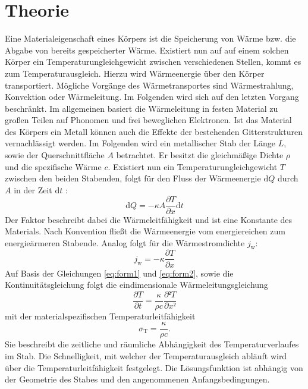 
\section{Theorie}
\label{sec:Theorie}
Eine Materialeigenschaft eines Körpers ist die Speicherung von Wärme bzw. die Abgabe
 von bereits gespeicherter Wärme. Existiert nun auf auf einem solchen Körper
 ein Temperaturungleichgewicht zwischen verschiedenen Stellen, kommt es zum Temperaturausgleich.
 Hierzu wird Wärmeenergie über den Körper transportiert.
Mögliche Vorgänge des Wärmetransportes sind Wärmestrahlung, Konvektion oder
  Wärmeleitung. Im Folgenden wird sich auf den letzten Vorgang beschränkt. Im
  allgemeinen basiert die Wärmeleitung in festen Material zu großen Teilen auf Phonomen und
   frei beweglichen Elektronen. Ist das Material des Körpers ein Metall können auch die Effekte der
    bestehenden Gitterstrukturen vernachlässigt werden. Im Folgenden wird ein metallischer Stab der
    Länge $L$, sowie der Querschnittfläche $A$ betrachtet. Er besitzt die
    gleichmäßige Dichte $\rho$ und die spezifische Wärme $c$. Existiert nun ein
    Temperaturungleichgewicht $T$ zwischen den beiden Stabenden, folgt für den Fluss
     der Wärmeenergie $\text{d}Q$ durch $A$ in der Zeit $\text{d}t$ :
     \begin{equation}
       \text{d}Q = -\kappa A \frac{\partial T}{\partial x} \text{d}t \label{eq:form1}
       \end{equation}
       Der Faktor \kappa beschreibt dabei die Wärmeleitfähigkeit und ist eine
        Konstante des Materials. Nach Konvention fließt die Wärmeenergie vom
         energiereichen zum energieärmeren Stabende. Analog folgt für die Wärmestromdichte $j_\text{w}$:
         \begin{equation}
           j_\text{w} = -\kappa \frac{\partial T}{\partial x} \label{eq:form2}
           \end{equation}
           Auf Basis der Gleichungen \ref{eq:form1} und \ref{eq:form2}, sowie die Kontinuitätsgleichung folgt
            die eindimensionale Wärmeleitungsgleichung
            \begin{equation}
              \frac{\partial T}{\partial t} = \frac{\kappa}{\rho c}\frac{\partial² T}{\partial x²}\label{eq:form3}
              \end{equation}
              mit der materialspezifischen Temperaturleitfähigkeit
              \begin{equation}
                \sigma_\text{T} = \frac{\kappa}{\rho c}\text{.}\label{eq:form4}
                \end{equation}
             Sie beschreibt
             die zeitliche und räumliche Abhängigkeit des Temperaturverlaufes im Stab.
             Die Schnelligkeit, mit welcher der Temperaturausgleich abläuft wird
             über die Temperaturleitfähigkeit festgelegt. Die Lösungsfunktion ist abhängig
             von der Geometrie des Stabes und den angenommenen Anfangsbedingungen.

